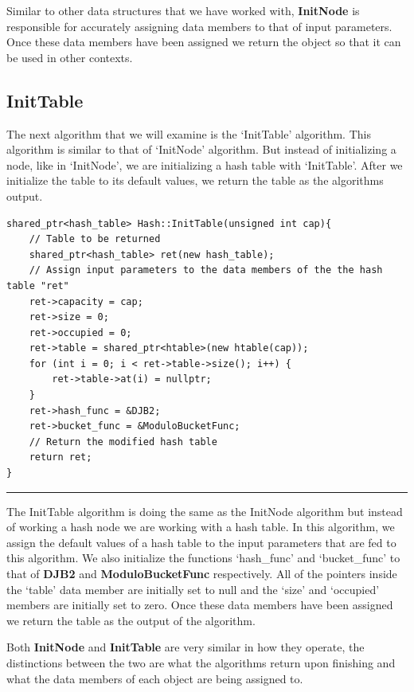 \documentclass[a4paper,9pt]{article}
\newcommand{\horizontalline}{\noindent \rule{\textwidth}{0.5pt}\par}
\begin{document}
\noindent Similar to other data structures that we have worked with, \textbf{InitNode} is responsible for accurately assigning data members to that of input parameters. Once these data members have 
been assigned we return the object so that it can be used in other contexts.

\subsection*{InitTable}

The next algorithm that we will examine is the `InitTable' algorithm. This algorithm is similar to that of `InitNode' algorithm. But instead of initializing a node, like in `InitNode', we are initializing
a hash table with `InitTable'. After we initialize the table to its default values, we return the table as the algorithms output.

\begin{highlight}

\begin{verbatim}
shared_ptr<hash_table> Hash::InitTable(unsigned int cap){
    // Table to be returned
    shared_ptr<hash_table> ret(new hash_table);
    // Assign input parameters to the data members of the the hash table "ret"
    ret->capacity = cap;
    ret->size = 0;
    ret->occupied = 0;
    ret->table = shared_ptr<htable>(new htable(cap));
    for (int i = 0; i < ret->table->size(); i++) {
        ret->table->at(i) = nullptr;
    }
    ret->hash_func = &DJB2;
    ret->bucket_func = &ModuloBucketFunc;
    // Return the modified hash table
    return ret;
}
\end{verbatim}

\horizontalline

The InitTable algorithm is doing the same as the InitNode algorithm but instead of working a hash node we are working with a hash table. In this algorithm, we assign the default values of a hash table to
the input parameters that are fed to this algorithm. We also initialize the functions `hash\_func' and `bucket\_func' to that of \textbf{DJB2} and \textbf{ModuloBucketFunc} respectively. All of the pointers
inside the `table' data member are initially set to null and the `size' and `occupied' members are initially set to zero. Once these data members have been assigned we return the table as the output of the
algorithm.
    
\end{highlight}

\noindent Both \textbf{InitNode} and \textbf{InitTable} are very similar in how they operate, the distinctions between the two are what the algorithms return upon finishing and what the data members of each
object are being assigned to.
\end{document}
